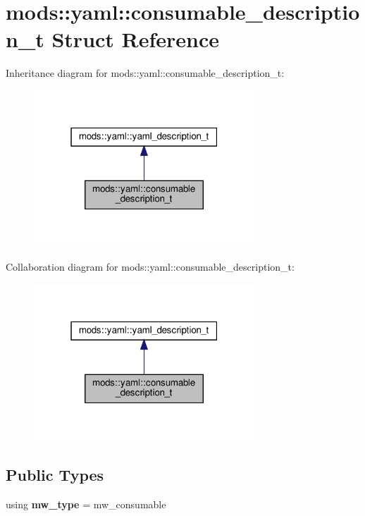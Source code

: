 \hypertarget{structmods_1_1yaml_1_1consumable__description__t}{}\section{mods\+:\+:yaml\+:\+:consumable\+\_\+description\+\_\+t Struct Reference}
\label{structmods_1_1yaml_1_1consumable__description__t}


Inheritance diagram for mods\+:\+:yaml\+:\+:consumable\+\_\+description\+\_\+t\+:
\nopagebreak
\begin{figure}[H]
\begin{center}
\leavevmode
\includegraphics[width=235pt]{structmods_1_1yaml_1_1consumable__description__t__inherit__graph}
\end{center}
\end{figure}


Collaboration diagram for mods\+:\+:yaml\+:\+:consumable\+\_\+description\+\_\+t\+:
\nopagebreak
\begin{figure}[H]
\begin{center}
\leavevmode
\includegraphics[width=235pt]{structmods_1_1yaml_1_1consumable__description__t__coll__graph}
\end{center}
\end{figure}
\subsection*{Public Types}
\begin{DoxyCompactItemize}
\item 
\mbox{\label{structmods_1_1yaml_1_1consumable__description__t_a14ec6b3d896a1f21e016d934679b2ebc}} 
using {\bfseries mw\+\_\+type} = mw\+\_\+consumable
\end{DoxyCompactItemize}
